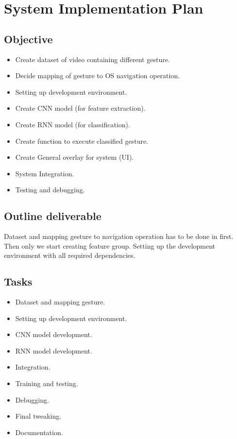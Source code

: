 \documentclass[oneside,a4paper,12pt]{report}
\begin{document}
        
    \section{System Implementation Plan}
        \subsection{Objective}  
            \begin{itemize}
                \item Create dataset of video containing different gesture.
                \item Decide mapping of gesture to OS navigation operation.
                \item Setting up development environment.
                \item Create CNN model (for feature extraction).
                \item Create RNN model (for classification).
                \item Create function to execute classified gesture.
                \item Create General overlay for system (UI).
                \item System Integration.
                \item Testing and debugging.

                
            \end{itemize}
            
            \subsection{Outline deliverable}
            Dataset and mapping gesture to navigation operation has to be done in first.
Then only we start creating feature group. Setting up the development environment with all required dependencies.

            \subsection{Tasks}
            
            
            \begin{itemize}
                \item Dataset and mapping gesture.
                \item Setting up development environment.
                \item CNN model development.
                \item RNN model development.
                \item Integration.
                \item Training and testing.
                \item Debugging.
                \item Final tweaking.
                \item Documentation.
                
            \end{itemize}
            
\end{document}
